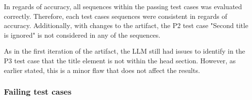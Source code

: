 In regards of accuracy, all sequences within the passing test cases was evaluated correctly. Therefore, each test cases sequences were consistent in regards of accuracy. Additionally‚ with changes to the artifact, the P2 test case "Second title is ignored" is not considered in any of the sequences. 

As in the first iteration of the artifact, the LLM still had issues to identify in the P3 test case that the title element is not within the head section. However, as earlier stated, this is a minor flaw that does not affect the results.

\subsubsection{Failing test cases}